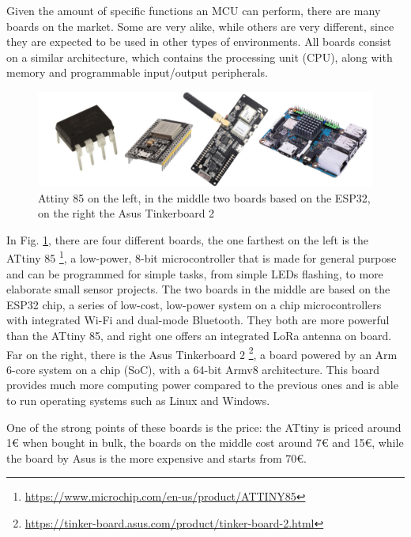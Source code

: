 	Given the amount of specific functions an MCU can perform, there are many boards on the market.
	Some are very alike, while others are very different, since they are expected to be used in other types of environments.
	All boards consist on a similar architecture, which contains the processing unit (CPU), along with memory and programmable input/output peripherals.
	
	\begin{figure}[H]
		\centering
		\includegraphics[width=\textwidth]{resources/img/chap3/generic_board}
		\caption{Attiny 85 on the left, in the middle two boards based on the ESP32, on the right the Asus Tinkerboard 2}
		\label{img:generic_board}
	\end{figure}

	In Fig. \ref{img:generic_board}, there are four different boards, the one farthest on the left is the ATtiny 85 \footnote{\url{https://www.microchip.com/en-us/product/ATTINY85}}, a low-power, 8-bit microcontroller that is made for general purpose and can be programmed for simple tasks, from simple LEDs flashing, to more elaborate small sensor projects.
	The two boards in the middle are based on the ESP32 chip, a series of low-cost, low-power system on a chip microcontrollers with integrated Wi-Fi and dual-mode Bluetooth.
	They both are more powerful than the ATtiny 85, and right one offers an integrated LoRa antenna on board.
	Far on the right, there is the Asus Tinkerboard 2 \footnote{\url{https://tinker-board.asus.com/product/tinker-board-2.html}}, a board powered by an Arm 6-core system on a chip (SoC), with a 64-bit Armv8 architecture.
	This board provides much more computing power compared to the previous ones and is able to run operating systems such as Linux and Windows.
	
	One of the strong points of these boards is the price: the ATtiny is priced around 1€ when bought in bulk, the boards on the middle cost around 7€ and 15€, while the board by Asus is the more expensive and starts from 70€.
	
